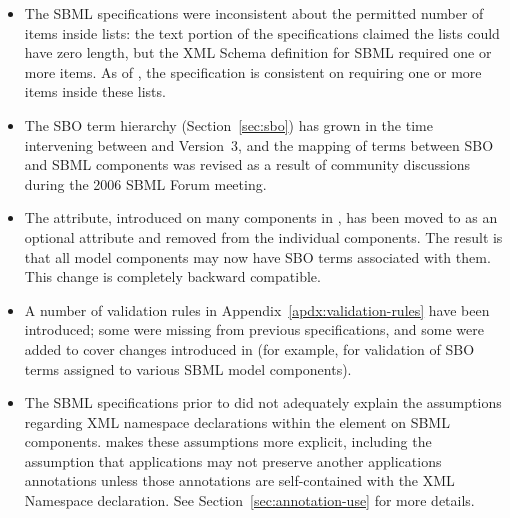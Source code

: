 \begin{itemize}
\item The SBML specifications were inconsistent about the
  permitted number of items inside
   lists: the text portion of the
  specifications claimed the lists could have zero length, but the
  XML Schema definition for SBML required one or more items.  As
  of \sbmltwothree, the specification is consistent on requiring
  one or more items inside these lists.

\item The SBO term hierarchy (Section~\ref{sec:sbo}) has grown in
  the time intervening between \sbmltwotwo and Version~3, and the
  mapping of terms between SBO and SBML components was revised as
  a result of community discussions during the 2006 SBML Forum
  meeting.

\item The  attribute, introduced on many components in
  \sbmltwotwo, has been moved to \SBase as an optional attribute
  and removed from the individual components.  The result is that
  all model components may now have SBO terms associated with
  them.  This change is completely backward compatible.

\item A number of validation rules in
  Appendix~\ref{apdx:validation-rules} have been introduced; some
  were missing from previous specifications, and some were added
  to cover changes introduced in \sbmltwothree (for example, for
  validation of SBO terms assigned to various SBML model
  components).

\item The SBML specifications prior to \sbmltwothree did not
  adequately explain the assumptions regarding XML namespace
  declarations within the  element on SBML
  components.  \sbmltwothree makes these assumptions more
  explicit, including the assumption that applications may not
  preserve another applications annotations unless those
  annotations are self-contained with the XML Namespace
  declaration.  See Section~\ref{sec:annotation-use} for more
  details.

\end{itemize}


